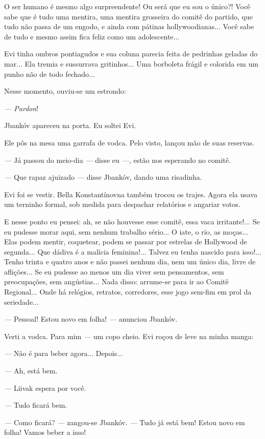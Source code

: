 O ser humano é mesmo algo surpreendente! Ou será que eu sou o único?!
Você sabe que é tudo uma mentira, uma mentira grosseira do comitê do
partido, que tudo não passa de um engodo, e ainda com pátinas
hollywoodianas... Você sabe de tudo e mesmo assim fica feliz como um
adolescente...

Evi tinha ombros pontiagudos e sua coluna parecia feita de pedrinhas
geladas do mar... Ela tremia e sussurrava gritinhos... Uma borboleta
frágil e colorida em um punho não de todo fechado...

Nesse momento, ouviu-se um estrondo:

\emph{--- Pardon}!

Jbankóv apareceu na porta. Eu soltei Evi.

Ele pôs na mesa uma garrafa de vodca. Pelo visto, lançou mão de suas
reservas.

\emph{---} Já passou do meio-dia \emph{---} disse eu \emph{---}, estão
nos esperando no comitê.

\emph{---} Que rapaz ajuizado \emph{---} disse Jbankóv, dando uma
risadinha.

Evi foi se vestir. Bella Konstantínovna também trocou os trajes. Agora
ela usava um terninho formal, sob medida para despachar relatórios e
angariar votos.

E nesse ponto eu pensei: ah, se não houvesse esse comitê, essa vaca
irritante!... Se eu pudesse morar aqui, sem nenhum trabalho sério... O
iate, o rio, as moças... Elas podem mentir, coquetear, podem se passar
por estrelas de Hollywood de segunda... Que dádiva é a malícia
feminina!... Talvez eu tenha nascido para isso!... Tenho trinta e quatro
anos e não passei nenhum dia, nem um único dia, livre de aflições... Se
eu pudesse ao menos um dia viver sem pensamentos, sem preocupações, sem
angústias... Nada disso: arrume-se para ir ao Comitê Regional... Onde há
relógios, retratos, corredores, esse jogo sem-fim em prol da
seriedade...

\emph{---} Pessoal! Estou novo em folha! \emph{---} anunciou Jbankóv.

Verti a vodca. Para mim \emph{---} um copo cheio. Evi roçou de leve na
minha manga:

\emph{---} Não é para beber agora... Depois...

\emph{---} Ah, está bem.

\emph{---} Liivak espera por você.

\emph{---} Tudo ficará bem.

\emph{---} Como ficará? \emph{---} zangou-se Jbankóv. \emph{---} Tudo já
está bem! Estou novo em folha! Vamos beber a isso!

